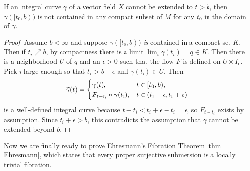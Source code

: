 \begin{lem}\label{lem escape}
If an integral curve $\gamma$ of a vector field $X$ cannot be extended to $t>b$, then $\gamma([t_0,b))$ is not contained in any compact subset of $M$ for any $t_0$ in the domain of $\gamma$.
\end{lem}
\begin{proof}
Assume $b<\infty$ and suppose $\gamma([t_0,b))$ \emph{is} contained in a compact set $K$. Then if $t_i\nearrow b$, by compactness there is a limit $\lim_i\gamma(t_i)=q\in K$. Then there is a neighborhood $U$ of $q$ and an $\epsilon>0$ such that the flow $F$ is defined on $U\times I_\epsilon$. Pick $i$ large enough so that $t_i>b-\epsilon$ and $\gamma(t_i)\in U$. Then 
\[
    \wt{\gamma}(t)=
    \begin{cases} 
        \gamma(t), & t\in[t_0,b),\\ 
        F_{t-t_i}\circ \gamma(t_i), & t\in (t_i-\epsilon,t_i+\epsilon)   
    \end{cases}
\]
is a well-defined integral curve because $t-t_i<t_i+\epsilon-t_i=\epsilon$, so $F_{t-t_i}$ exists by assumption. Since $t_i+\epsilon>b$, this contradicts the assumption that $\gamma $ cannot be extended beyond $b$.
\end{proof}


Now we are finally ready to prove Ehresmann's Fibration Theorem \ref{thm Ehresmann}, which states that every proper surjective submersion is a locally trivial fibration.

